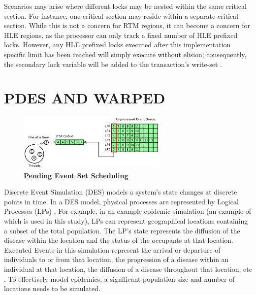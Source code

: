 \documentclass{sig-alternate}
\begin{document}
Scenarios may arise where different locks may be nested within the same critical section.
For instance, one critical section may reside within a separate critical section.  While
this is not a concern for RTM regions, it can become a concern for HLE regions, as the
processor can only track a fixed number of HLE prefixed locks.  However, any HLE prefixed
locks executed after this implementation specific limit has been reached will simply
execute without elision; consequently, the secondary lock variable will be added to the
transaction's write-set \cite{intel_prog_ref}.

\vspace*{-\medskipamount}
\section{PDES AND WARPED}\label{warped}

\begin{figure}
    \centering
    \graphicspath{ {./figures/} }
    \includegraphics[width=0.65\textwidth,keepaspectratio]{single_ltsf_queue}
    \caption{\textbf{Pending Event Set Scheduling}}\label{fig:singleLTSFqueue}
\end{figure}

Discrete Event Simulation (DES) models a system's state changes at discrete points in
time.  In a DES model, physical processes are represented by Logical Processes (LPs)
\cite{des_misra}.  For example, in an example epidemic simulation (an example of which is
used in this study), LPs can represent geographical locations containing a subset of the
total population.  The LP's state represents the diffusion of the disease within the
location and the status of the occupants at that location.  Executed Events in this
simulation represent the arrival or departure of individuals to or from that location, the
progression of a disease within an individual at that location, the diffusion of a disease
throughout that location, etc \cite{epidemic}.  To effectively model epidemics, a
significant population size and number of locations needs to be simulated.
\end{document}
